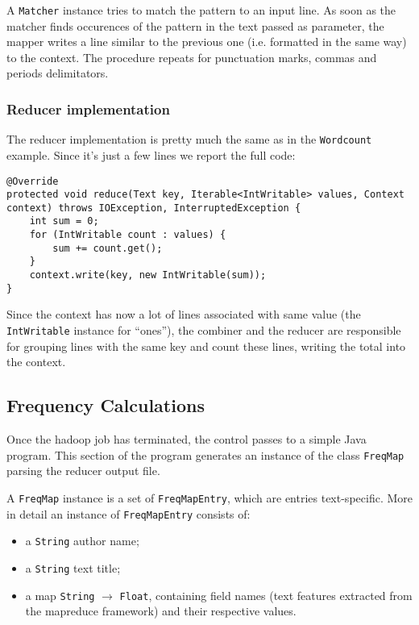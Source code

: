 \documentclass[a4paper,11pt, twoside]{article}
\begin{document}
	A \lstinline|Matcher| instance tries to match the pattern to an input line. As soon as the matcher finds occurences of the pattern in the text passed as parameter, the mapper writes a line similar to the previous one (i.e. formatted in the same way) to the context. The procedure repeats for punctuation marks, commas and periods delimitators.
	
	\subsubsection{Reducer implementation}
	The reducer implementation is pretty much the same as in the \lstinline|Wordcount| example. Since it's just a few lines we report the full code:
	\begin{lstlisting}[firstnumber=135, caption={Reduce method}, captionpos=b]
@Override
protected void reduce(Text key, Iterable<IntWritable> values, Context context) throws IOException, InterruptedException {
	int sum = 0;
	for (IntWritable count : values) {
		sum += count.get();
	}
	context.write(key, new IntWritable(sum));
}
	\end{lstlisting}
	
	Since the context has now a lot of lines associated with same value (the \lstinline|IntWritable| instance for ``ones''), the combiner and the reducer are responsible for grouping lines with the same key and count these lines, writing the total into the context.
	
	
	\subsection{Frequency Calculations}
	Once the hadoop job has terminated, the control passes to a simple Java program. This section of the program generates an instance of the class \lstinline|FreqMap| parsing the reducer output file.
	
	A \lstinline|FreqMap| instance is a set of \lstinline|FreqMapEntry|, which are entries text-specific. More in detail an instance of \lstinline|FreqMapEntry| consists of: \begin{itemize}
		\item a \lstinline|String| author name;
		\item a \lstinline|String| text title;
		\item a map \lstinline|String| $\to$ \lstinline|Float|, containing field names (text features extracted from the mapreduce framework) and their respective values.
	\end{itemize}
\end{document}
